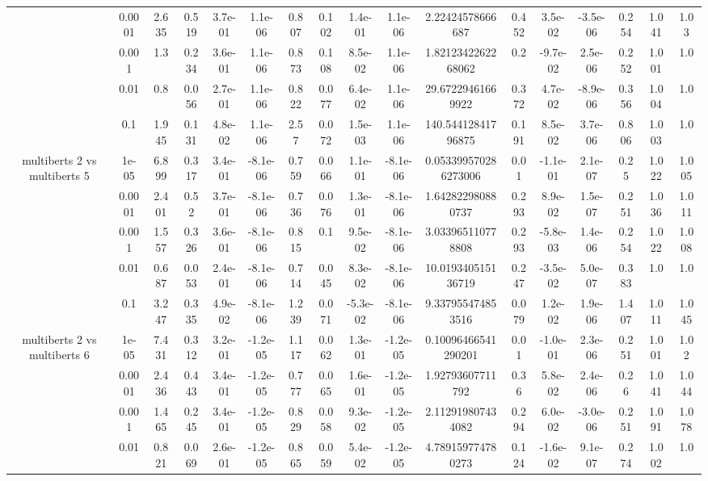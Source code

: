\begin{tabular}{|c|c|c|c|c|c|c|c|c|c|c|c|c|c|c|c|c|}
 & 0.0001 & 2.635 & 0.519 & 3.7e-01 & 1.1e-06 & 0.807 & 0.102 & 1.4e-01 & 1.1e-06 & 2.22424578666687 & 0.452 & 3.5e-02 & -3.5e-06 & 0.254 & 1.041 & 1.03 \\
 & 0.001 & 1.3 & 0.234 & 3.6e-01 & 1.1e-06 & 0.873 & 0.108 & 8.5e-02 & 1.1e-06 & 1.8212342262268062 & 0.2 & -9.7e-02 & 2.5e-06 & 0.252 & 1.001 & 1.0 \\
 & 0.01 & 0.8 & 0.056 & 2.7e-01 & 1.1e-06 & 0.822 & 0.077 & 6.4e-02 & 1.1e-06 & 29.67229461669922 & 0.372 & 4.7e-02 & -8.9e-06 & 0.356 & 1.004 & 1.0 \\
 & 0.1 & 1.945 & 0.131 & 4.8e-02 & 1.1e-06 & 2.57 & 0.072 & 1.5e-03 & 1.1e-06 & 140.54412841796875 & 0.191 & 8.5e-02 & 3.7e-06 & 0.806 & 1.003 & 1.0 \\
\hline
\multirow{5}{*}{multiberts 2 vs multiberts 5} & 1e-05 & 6.899 & 0.317 & 3.4e-01 & -8.1e-06 & 0.759 & 0.066 & 1.1e-01 & -8.1e-06 & 0.053399570286273006 & 0.01 & -1.1e-01 & 2.1e-07 & 0.25 & 1.022 & 1.005 \\
 & 0.0001 & 2.401 & 0.52 & 3.7e-01 & -8.1e-06 & 0.736 & 0.076 & 1.3e-01 & -8.1e-06 & 1.642822980880737 & 0.293 & 8.9e-02 & 1.5e-07 & 0.251 & 1.036 & 1.011 \\
 & 0.001 & 1.557 & 0.326 & 3.6e-01 & -8.1e-06 & 0.815 & 0.1 & 9.5e-02 & -8.1e-06 & 3.033965110778808 & 0.293 & -5.8e-03 & 1.4e-06 & 0.254 & 1.022 & 1.008 \\
 & 0.01 & 0.687 & 0.053 & 2.4e-01 & -8.1e-06 & 0.714 & 0.045 & 8.3e-02 & -8.1e-06 & 10.019340515136719 & 0.247 & -3.5e-02 & 5.0e-07 & 0.383 & 1.0 & 1.0 \\
 & 0.1 & 3.247 & 0.335 & 4.9e-02 & -8.1e-06 & 1.239 & 0.071 & -5.3e-02 & -8.1e-06 & 9.337955474853516 & 0.079 & 1.2e-02 & 1.9e-06 & 1.407 & 1.011 & 1.045 \\
\hline
\multirow{5}{*}{multiberts 2 vs multiberts 6} & 1e-05 & 7.431 & 0.312 & 3.2e-01 & -1.2e-05 & 1.117 & 0.062 & 1.3e-01 & -1.2e-05 & 0.10096466541290201 & 0.01 & -1.0e-01 & 2.3e-06 & 0.251 & 1.001 & 1.02 \\
 & 0.0001 & 2.436 & 0.443 & 3.4e-01 & -1.2e-05 & 0.777 & 0.065 & 1.6e-01 & -1.2e-05 & 1.92793607711792 & 0.36 & 5.8e-02 & 2.4e-06 & 0.26 & 1.041 & 1.044 \\
 & 0.001 & 1.465 & 0.245 & 3.4e-01 & -1.2e-05 & 0.829 & 0.058 & 9.3e-02 & -1.2e-05 & 2.112919807434082 & 0.294 & 6.0e-02 & -3.0e-06 & 0.251 & 1.091 & 1.078 \\
 & 0.01 & 0.821 & 0.069 & 2.6e-01 & -1.2e-05 & 0.865 & 0.059 & 5.4e-02 & -1.2e-05 & 4.789159774780273 & 0.124 & -1.6e-02 & 9.1e-07 & 0.274 & 1.002 & 1.0 \\

\end{tabular}
